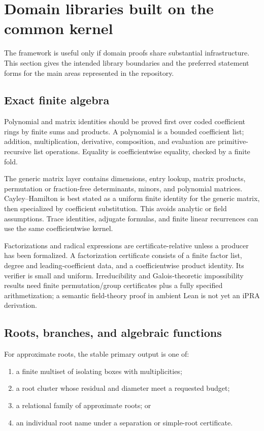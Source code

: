 \section{Domain libraries built on the common kernel}
\label{sec:domain-libraries}

The framework is useful only if domain proofs share substantial infrastructure.
This section gives the intended library boundaries and the preferred statement
forms for the main areas represented in the repository.

\subsection{Exact finite algebra}

Polynomial and matrix identities should be proved first over coded coefficient
rings by finite sums and products.  A polynomial is a bounded coefficient list;
addition, multiplication, derivative, composition, and evaluation are
primitive-recursive list operations.  Equality is coefficientwise equality,
checked by a finite fold.

The generic matrix layer contains dimensions, entry lookup, matrix products,
permutation or fraction-free determinants, minors, and polynomial matrices.
Cayley--Hamilton is best stated as a uniform finite identity for the generic
matrix, then specialized by coefficient substitution.  This avoids analytic
or field assumptions.  Trace identities, adjugate formulas, and finite linear
recurrences can use the same coefficientwise kernel.

Factorizations and radical expressions are certificate-relative unless a
producer has been formalized.  A factorization certificate consists of a
finite factor list, degree and leading-coefficient data, and a coefficientwise
product identity.  Its verifier is small and uniform.  Irreducibility and
Galois-theoretic impossibility results need finite permutation/group
certificates plus a fully specified arithmetization; a semantic field-theory
proof in ambient Lean is not yet an iPRA derivation.

\subsection{Roots, branches, and algebraic functions}

For approximate roots, the stable primary output is one of:

\begin{enumerate}
\item a finite multiset of isolating boxes with multiplicities;
\item a root cluster whose residual and diameter meet a requested budget;
\item a relational family of approximate roots; or
\item an individual root name under a separation or simple-root certificate.
\end{enumerate}

